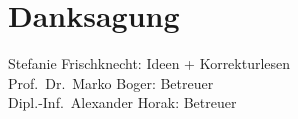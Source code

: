\chapter{Danksagung}

Stefanie Frischknecht: Ideen + Korrekturlesen \\
Prof.\ Dr.\ Marko Boger: Betreuer \\
Dipl.-Inf.\ Alexander Horak: Betreuer
